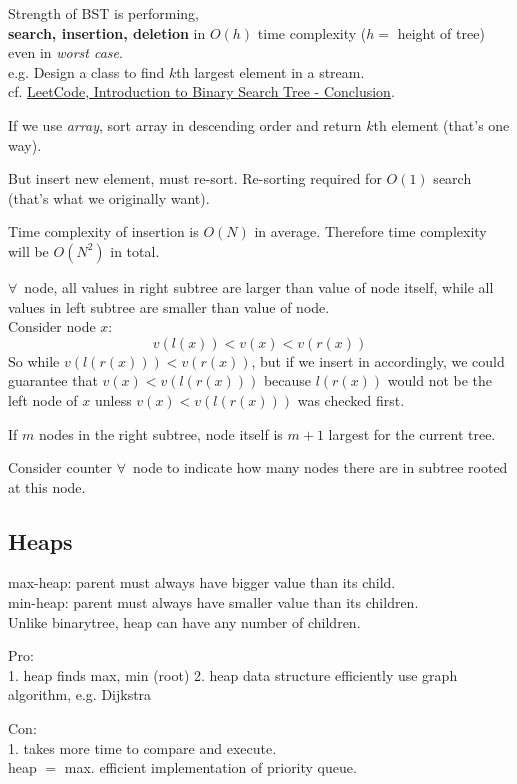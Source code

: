 \documentclass[10pt]{amsart}
\begin{document}
\begin{multicols*}{2}
Strength of BST is performing, \\
\textbf{search, insertion, deletion} in $O(h)$ time complexity ($h = $ height of tree) even in \emph{worst case}. \\

e.g. Design a class to find $k$th largest element in a stream. \\

cf. \href{https://leetcode.com/explore/learn/card/introduction-to-data-structure-binary-search-tree/142/conclusion/1009/}{LeetCode, Introduction to Binary Search Tree - Conclusion}. 

If we use \emph{array}, sort array in descending order and return $k$th element (that's one way).  

But insert new element, must re-sort. Re-sorting required for $O(1)$ search (that's what we originally want).

Time complexity of insertion is $O(N)$ in average. Therefore time complexity will be $O(N^2)$ in total.

$\forall \, $ node, all values in right subtree are larger than value of node itself, while all values in left subtree are smaller than value of node. \\
Consider node $x$:
\[
v(l(x)) < v(x) < v(r(x))
\]
So while $v(l(r(x))) < v(r(x))$, but if we insert in accordingly, we could guarantee that $v(x) < v(l(r(x)))$ because $l(r(x))$ would not be the left node of $x$ unless $v(x) < v(l(r(x)))$ was checked first.

If $m$ nodes in the right subtree, node itself is $m+1$ largest for the current tree.

Consider counter $\forall \,$ node to indicate how many nodes there are in subtree rooted at this node.

\subsection{Heaps}

max-heap: parent must always have bigger value than its child. \\
min-heap: parent must always have smaller value than its children. \\
Unlike binarytree, heap can have any number of children. 

Pro: \\ 
1. heap finds max, min (root)
2. heap data structure efficiently use graph algorithm, e.g. Dijkstra

Con: \\
1. takes more time to compare and execute. \\
heap $ = $ max. efficient implementation of priority queue. 


\end{multicols*}
\end{document}
